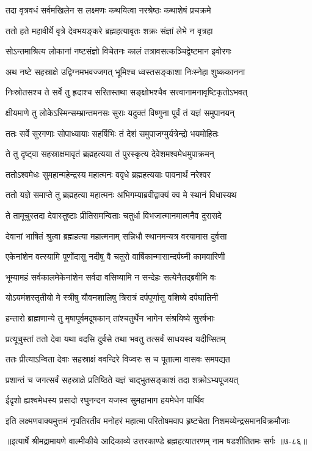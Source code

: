 
\twolineshloka
{तदा वृत्रवधं सर्वमखिलेन स लक्ष्मणः}
{कथयित्वा नरश्रेष्ठः कथाशेषं प्रचक्रमे} %

\twolineshloka
{ततो हते महावीर्ये वृत्रे देवभयङ्करे}
{ब्रह्महत्यावृतः शक्रः संज्ञां लेभे न वृत्रहा} %

\twolineshloka
{सोऽन्तमाश्रित्य लोकानां नष्टसंज्ञो विचेतनः}
{कालं तत्रावसत्कञ्चिद्वेष्टमान इवोरगः} %

\twolineshloka
{अथ नष्टे सहस्राक्षे उद्विग्नमभवज्जगत्}
{भूमिश्च ध्वस्तसङ्काशा निःस्नेहा शुष्ककानना} %

\twolineshloka
{निःस्रोतसश्च ते सर्वे तु ह्रदाश्च सरितस्तथा}
{सङ्क्षोभश्चैव सत्त्वानामनावृष्टिकृतोऽभवत्} %

\twolineshloka
{क्षीयमाणे तु लोकेऽस्मिन्सम्भ्रान्तमनसः सुराः}
{यदुक्तं विष्णुना पूर्वं तं यज्ञं समुपानयन्} %

\twolineshloka
{ततः सर्वे सुरगणाः सोपाध्यायाः सहर्षिभिः}
{तं देशं समुपाजग्मुर्यत्रेन्द्रो भयमोहितः} %

\twolineshloka
{ते तु दृष्ट्वा सहस्राक्षमावृतं ब्रह्महत्यया}
{तं पुरस्कृत्य देवेशमश्वमेधमुपाक्रमन्} %

\twolineshloka
{ततोऽश्वमेधः सुमहान्महेन्द्रस्य महात्मनः}
{ववृधे ब्रह्महत्ययाः पावनार्थं नरेश्वर} %

\twolineshloka
{ततो यज्ञे समाप्ते तु ब्रह्महत्या महात्मनः}
{अभिगम्याब्रवीद्वाक्यं क्व मे स्थानं विधास्यथ} %

\twolineshloka
{ते तामूचुस्तदा देवास्तुष्टाः प्रीतिसमन्विताः}
{चतुर्धा विभजात्मानमात्मनैव दुरासदे} %

\twolineshloka
{देवानां भाषितं श्रुत्वा ब्रह्महत्या महात्मनाम्}
{सन्निधौ स्थानमन्यत्र वरयामास दुर्वसा} %

\twolineshloka
{एकेनांशेन वत्स्यामि पूर्णोदासु नदीषु वै}
{चतुरो वार्षिकान्मासान्दर्पघ्नी कामवारिणी} %

\twolineshloka
{भूम्यामहं सर्वकालमेकेनांशेन सर्वदा}
{वसिष्यामि न सन्देहः सत्येनैतद्ब्रवीमि वः} %

\twolineshloka
{योऽयमंशस्तृतीयो मे स्त्रीषु यौवनशालिषु}
{त्रिरात्रं दर्पपूर्णासु वशिष्ये दर्पघातिनी} %

\twolineshloka
{हन्तारो ब्राह्मणान्ये तु मृषापूर्वमदूषकान्}
{तांश्चतुर्थेन भागेन संश्रयिष्ये सुरर्षभाः} %

\twolineshloka
{प्रत्यूचुस्तां ततो देवा यथा वदसि दुर्वसे}
{तथा भवतु तत्सर्वं साधयस्व यदीप्सितम्} %

\twolineshloka
{ततः प्रीत्याऽन्विता देवाः सहस्राक्षं ववन्दिरे}
{विज्वरः स च पूतात्मा वासवः समपद्यत} %

\twolineshloka
{प्रशान्तं च जगत्सर्वं सहस्राक्षे प्रतिष्ठिते}
{यज्ञं चाद्भुतसङ्काशं तदा शक्रोऽभ्यपूजयत्} %

\twolineshloka
{ईदृशो ह्यश्वमेधस्य प्रसादो रघुनन्दन}
{यजस्व सुमहाभाग हयमेधेन पार्थिव} %

\twolineshloka
{इति लक्ष्मणवाक्यमुत्तमं नृपतिरतीव मनोहरं महात्मा}
{परितोषमवाप हृष्टचेता निशमय्येन्द्रसमानविक्रमौजाः} %


॥इत्यार्षे श्रीमद्रामायणे वाल्मीकीये आदिकाव्ये उत्तरकाण्डे ब्रह्महत्यातरणम् नाम षडशीतितमः सर्गः ॥७-८६॥
